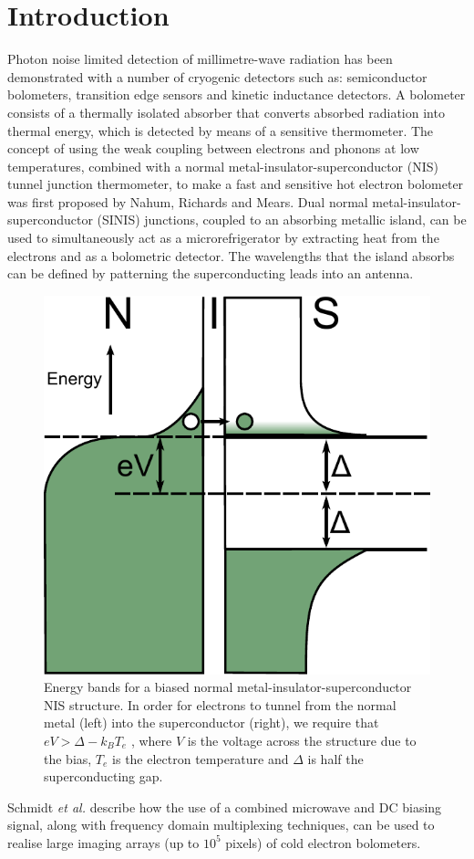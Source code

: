 \documentclass[aip, apl, a4paper, amsmath,amssymb, reprint]{revtex4-1}
\begin{document}
\section{Introduction} \label{sec:Introduction}
Photon noise limited detection of millimetre-wave radiation has been demonstrated with a number of cryogenic detectors such as: semiconductor bolometers, transition edge sensors and kinetic inductance detectors\cite{Morozov11,Doyle08}. A bolometer consists of a thermally isolated absorber that converts absorbed radiation into thermal energy, which is detected by means of a sensitive thermometer. The concept of using the weak coupling between electrons and phonons at low temperatures, combined with a normal metal-insulator-superconductor (NIS) tunnel junction thermometer, to make a fast and sensitive hot electron bolometer was first proposed by Nahum, Richards and Mears\cite{Nahum93, Nahum94}. Dual normal metal-insulator-superconductor (SINIS) junctions, coupled to an absorbing metallic island, can be used to simultaneously act as a microrefrigerator by extracting heat from the electrons and as a bolometric detector. The wavelengths that the island absorbs can be defined by patterning the superconducting leads into an antenna.
\begin{figure}[ht]
\includegraphics[width = 0.5\columnwidth]{NIS_energyLevels_Bias}
\caption{Energy bands for a biased normal metal-insulator-superconductor NIS structure. In order for electrons to tunnel from the normal metal (left) into the superconductor (right), we require that  $eV > \Delta - k_{B}T_{e}$ , where $V$  is the voltage across the structure due to the bias, $T_{e}$ is the electron temperature and $\Delta $ is half the superconducting gap.}
\label{fig:NISenergy}
\end{figure}

Schmidt \textit{et al.}\cite{Schmidt2005} describe how the use of a combined microwave and DC biasing signal, along with frequency domain multiplexing techniques, can be used to realise large imaging arrays (up to $10^{5}$ pixels) of cold electron bolometers.
\end{document}
